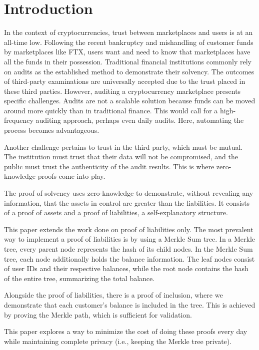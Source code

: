 
\chapter{Introduction}

In the context of cryptocurrencies, trust between marketplaces and users is at an all-time low. Following the recent bankruptcy and mishandling of customer funds by marketplaces like FTX, users want and need to know that marketplaces have all the funds in their possession. 
Traditional financial institutions commonly rely on audits as the established method to demonstrate their solvency. The outcomes of third-party examinations are universally accepted due to the trust placed in these third parties. However, auditing a cryptocurrency marketplace presents specific challenges. 
Audits are not a scalable solution because funds can be moved around more quickly than in traditional finance. This would call for a high-frequency auditing approach, perhaps even daily audits. Here, automating the process becomes advantageous.

Another challenge pertains to trust in the third party, which must be mutual. The institution must trust that their data will not be compromised, and the public must trust the authenticity of the audit results. This is where zero-knowledge proofs come into play. 

The proof of solvency uses zero-knowledge to demonstrate, without revealing any information, that the assets in control are greater than the liabilities. It consists of a proof of assets and a proof of liabilities, a self-explanatory structure.

This paper extends the work done on proof of liabilities only. The most prevalent way to implement a proof of liabilities is by using a Merkle Sum tree. 
In a Merkle tree, every parent node represents the hash of its child nodes. In the Merkle Sum tree, each node additionally holds the balance information. The leaf nodes consist of user IDs and their respective balances, while the root node contains the hash of the entire tree, summarizing the total balance.

Alongside the proof of liabilities, there is a proof of inclusion, where we demonstrate that each customer's balance is included in the tree. This is achieved by proving the Merkle path, which is sufficient for validation.

This paper explores a way to minimize the cost of doing these proofs every day while maintaining complete privacy (i.e., keeping the Merkle tree private).


